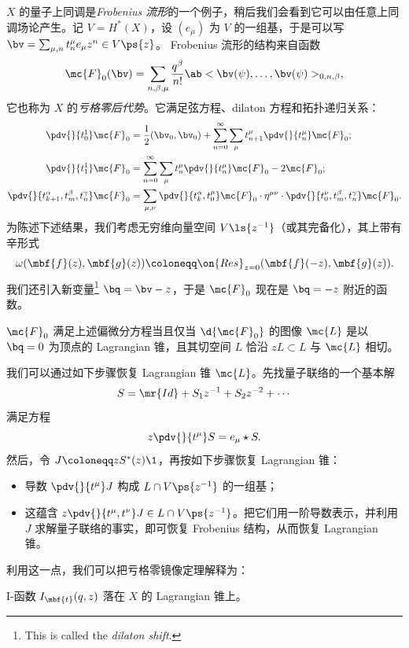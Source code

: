 \(X\) 的量子上同调是\textit{Frobenius 流形}的一个例子，稍后我们会看到它可以由任意上同调场论产生。记 \(V = H^*(X)\)，设 \((e_{\mu})\) 为 \(V\) 的一组基，于是可以写 $\bv = \sum_{\mu,n} t^{\mu}_n e_{\mu} z^n \in V\ps{z}$。
Frobenius 流形的结构来自函数
\[
    \mc{F}_0(\bv) = \sum_{n, \beta, \mu} \frac{q^{\beta}}{n!} \ab<\bv(\psi), \ldots, \bv(\psi)>_{0,n,\beta},
\]
它也称为 \(X\) 的\textit{亏格零后代势}。它满足弦方程、dilaton 方程和拓扑递归关系：
\begin{align*}
    \pdv{}{t_0^1} \mc{F}_0 &= \frac{1}{2} (\bv_0, \bv_0) + \sum_{n=0}^{\infty} \sum_{\mu} t_{n+1}^{\mu} \pdv{}{t_n^{\mu}} \mc{F}_0; \\
    \pdv{}{t_1^1} \mc{F}_0 &= \sum_{n=0}^{\infty} \sum_{\mu} t_n^{\mu} \pdv{}{t_n^{\mu}}\mc{F}_0 - 2 \mc{F}_0; \\
    \pdv{}{t_{k+1}^{\alpha},t_m^{\beta},t_n^{\gamma}} \mc{F}_0 &= \sum_{\mu,\nu} \pdv{}{t_k^{\alpha},t_0^{\mu}} \mc{F}_0 \cdot \eta^{\mu\nu} \cdot \pdv{}{t_0^{\nu},t_{m}^{\beta},t_n^{\gamma}} \mc{F}_0.
\end{align*}
为陈述下述结果，我们考虑无穷维向量空间 $V\ls{z^{-1}}$（或其完备化），其上带有辛形式
\[ \omega(\mbf{f}(z), \mbf{g}(z)) \coloneqq \on{Res}_{z=0}(\mbf{f}(-z), \mbf{g}(z)). \]
我们还引入新变量\footnote{This is called the \textit{dilaton shift}.} $\bq = \bv - z$，于是 \(\mc{F}_0\) 现在是 \(\bq = -z\) 附近的函数。

\begin{thm}
    \(\mc{F}_0\) 满足上述偏微分方程当且仅当 \(\d{\mc{F}_0}\) 的图像 \(\mc{L}\) 是以 \(\bq = 0\) 为顶点的 Lagrangian 锥，且其切空间 \(L\) 恰沿 \(zL \subset L\) 与 \(\mc{L}\) 相切。
\end{thm}

我们可以通过如下步骤恢复 Lagrangian 锥 \(\mc{L}\)。先找量子联络的一个基本解
\[ S = \mr{Id} + S_1 z^{-1} + S_2 z^{-2} + \cdots \]
满足方程
\[ z \pdv{}{t^{\mu}}S = e_{\mu} \star S. \]
然后，令 $J \coloneqq z S^*(z) \1$，再按如下步骤恢复 Lagrangian 锥：
\begin{itemize}
    \item 导数 \(\pdv{}{t^{\mu}} J\) 构成 \(L \cap V\ps{z^{-1}}\) 的一组基；
    \item 这蕴含 \(z \pdv{}{t^{\mu},t^{\nu}} J \in L \cap V \ps{z^{-1}}\)。把它们用一阶导数表示，并利用 \(J\) 求解量子联络的事实，即可恢复 Frobenius 结构，从而恢复 Lagrangian 锥。
\end{itemize}

利用这一点，我们可以把亏格零镜像定理解释为：
\begin{thm}
    I-函数 \(I_{\mbf{t}}(q,z)\) 落在 \(X\) 的 Lagrangian 锥上。
\end{thm}




